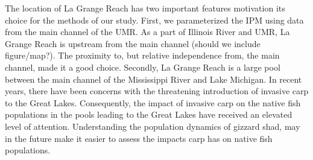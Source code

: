 \documentclass[preprint,review,12pt,authoryear]{elsarticle}
\begin{document}
The location of La Grange Reach has two important features motivation its choice for the methods of our study. 
First, we parameterized the IPM using data from the main channel of the UMR.  As a part of Illinois River and UMR, La Grange Reach is upstream from the main channel (should we include figure/map?).  
The proximity to, but relative independence from, the main channel, made it a good choice.  Secondly, La Grange Reach is a large pool between the main channel of the Mississippi River and Lake Michigan.  
In recent years, there have been concerns with the threatening introduction of invasive carp to the Great Lakes.  
Consequently, the impact of invasive carp on the native fish populations in the pools leading to the Great Lakes have received an elevated level of attention.  
Understanding the population dynamics of gizzard shad, may in the future make it easier to assess the impacts carp has on native fish populations.
\end{document}
